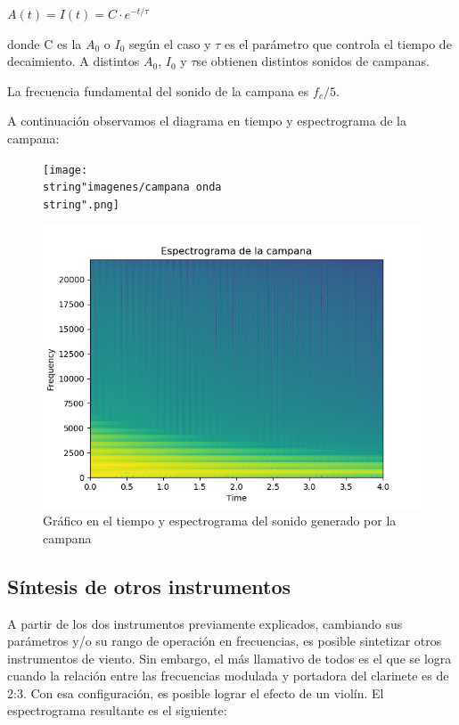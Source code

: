 \documentclass[../ASSD_TP2.tex]{subfiles}
\begin{document}
$A(t)=I(t)=C\cdot e^{-t/\tau}$ 

donde C es la $A_{0}$ o $I_{0}$ según el caso y $\tau$ es el parámetro
que controla el tiempo de decaimiento. A distintos $A_{0}$, $I_{0}$
y $\tau$se obtienen distintos sonidos de campanas.

La frecuencia fundamental del sonido de la campana es $f_{c}/5$.

A continuación observamos el diagrama en tiempo y espectrograma de
la campana:

\begin{figure}[H]
\begin{centering}
\texttt{[image: \\string"imagenes/campana onda\\string".png]}
\par\end{centering}
\centering{}\includegraphics[scale=0.75]{imagenes/Figure_1}\caption{Gráfico en el tiempo y espectrograma del sonido generado por la campana}
\end{figure}


\subsection{Síntesis de otros instrumentos}

A partir de los dos instrumentos previamente explicados, cambiando
sus parámetros y/o su rango de operación en frecuencias, es posible
sintetizar otros instrumentos de viento. Sin embargo, el más llamativo
de todos es el que se logra cuando la relación entre las frecuencias
modulada y portadora del clarinete es de 2:3. Con esa configuración,
es posible lograr el efecto de un violín. El espectrograma resultante
es el siguiente:
\end{document}
